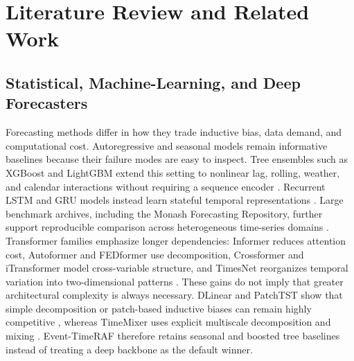\section{Literature Review and Related Work}

\subsection{Statistical, Machine-Learning, and Deep Forecasters}
Forecasting methods differ in how they trade inductive bias, data demand, and
computational cost. Autoregressive and seasonal models remain informative
baselines because their failure modes are easy to inspect. Tree ensembles such
as XGBoost and LightGBM extend this setting to nonlinear lag, rolling, weather,
and calendar interactions without requiring a sequence encoder
\cite{chen2016xgboost,ke2017lightgbm}. Recurrent LSTM and GRU models instead
learn stateful temporal representations \cite{hochreiter1997lstm,cho2014gru}.
Large benchmark archives, including the Monash Forecasting Repository, further
support reproducible comparison across heterogeneous time-series domains
\cite{godahewa2021monash}.
Transformer families emphasize longer dependencies: Informer reduces attention
cost, Autoformer and FEDformer use decomposition, Crossformer and iTransformer
model cross-variable structure, and TimesNet reorganizes temporal variation
into two-dimensional patterns
\cite{zhou2021informer,wu2021autoformer,zhou2022fedformer,zhang2023crossformer,liu2024itransformer,wu2023timesnet}.
These gains do not imply that greater architectural complexity is always
necessary. DLinear and PatchTST show that simple decomposition or patch-based
inductive biases can remain highly competitive \cite{zeng2023dlinear,nie2023patchtst},
whereas TimeMixer uses explicit multiscale decomposition and mixing
\cite{wang2024timemixer}. Event-TimeRAF therefore retains seasonal and boosted
tree baselines instead of treating a deep backbone as the default winner.

